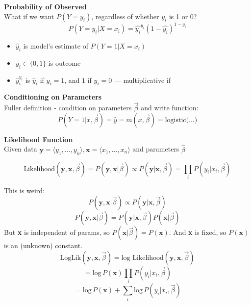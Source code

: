 \documentclass[letterpaper, 10.5pt,landscape]{article}
\begin{document}
\begin{multicols*}{3}
\vspace{3pt}

\textbf{Probability of Observed} \\
What if we want $P(Y=y_{i})$, regardless of whether $y_{i}$ is 1 or 0? \\
\vspace{-5pt}
\[P \left(Y=y_{i} | X=x_{i} \right) = \hat{y_{i}}^{y_{i}} \left(1- \hat{y_{i}}\right)^{1-y_{i}}  \]

\begin{itemize}
    \item $\hat{y}_{i}$ is model's estimate of $P(Y=1|X=x_{i})$
    \item $y_{i} \in \{0,1 \}$ is outcome
    \item $\hat{y}_{i}^{y_{i}}$ is $\hat{y}_{i}$ if $y_{i} = 1$, and $1$ if $y_{i} = 0$  — multiplicative if 
\end{itemize}

\textbf{Conditioning on Parameters} \\
Fuller definition -  condition on parameters $\vec{\beta}$ and write function: 
\vspace{-5pt}
\[P(Y=1|x, \vec{\beta}) = \hat{y} = m(x, \vec{\beta}) = \text{logistic(...)}\]

\vspace{3pt}
\textbf{Likelihood Function} \\
Given data \(\textbf{y} = \langle y_{1}, ... , y_{n} \rangle, \textbf{x} = \langle x_{1}, ..., x_{n} \rangle \) and parameters $\hat{\beta}$
\vspace{-3pt}

\[\text{Likelihood} (\textbf{y}, \textbf{x}, \vec{\beta}) = P(\textbf{y},\textbf{x}|\vec{\beta}) \propto P(\textbf{y}|\textbf{x}, \vec{\beta}) = \prod_{i} P(y_{i}|x_{i}, \vec{\beta}) \]

This is weird: \[ P(\textbf{y},\textbf{x} | \vec{\beta}) \propto P(\textbf{y} | \textbf{x}, \vec{\beta}) \]
\[ P(\textbf{y},\textbf{x} | \vec{\beta}) = P(\textbf{y} | \textbf{x}, \vec{\beta}) P(\textbf{x}|\vec{\beta}) \]
But \textbf{x} is independent of params, so \(P(\textbf{x}|\vec{\beta}) = P(\textbf{x}) \). And \textbf{x} is fixed, so \(P(\textbf{x}) \) is an (unknown) constant.
\[\text{LogLik}(\textbf{y}, \textbf{x}, \vec{\beta}) = \text{log Likelihood}(\textbf{y},\textbf{x}, \vec{\beta}) \]
\vspace{-5pt}
\[= \text{log} \, P(\textbf{x}) \prod_{i} P\left( y_{i}|x_{i}, \vec{\beta} \right) \] \vspace{-3pt}
\[= \text{log} \, P(\textbf{x})  + \sum_{i} \text{log} \, P \left( y_{i}|x_{i}, \vec{\beta} \right) \] 


\end{multicols*}
\end{document}
